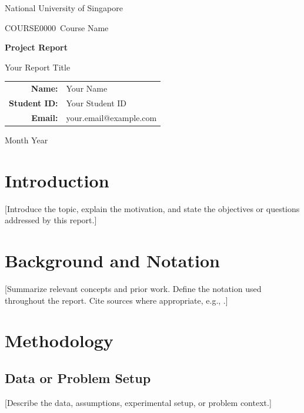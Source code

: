 \documentclass[11pt]{article}
\makeatletter
\newcommand{\University}{National University of Singapore}
\newcommand{\CourseCode}{COURSE0000}
\newcommand{\CourseName}{Course Name}
\newcommand{\ReportType}{Project Report}
\newcommand{\ReportTitle}{Your Report Title}
\newcommand{\StudentName}{Your Name}
\newcommand{\StudentID}{Your Student ID}
\newcommand{\StudentEmail}{your.email@example.com}
\newcommand{\ReportDate}{Month Year}
\makeatother
\begin{document}
\begin{titlepage}
\centering
\vspace*{2.0cm}
{\Large \University\par}
\vspace{0.4cm}
{\large \CourseCode\ \CourseName\par}
\vspace{2.0cm}
{\Huge\bfseries \ReportType\par}
\vspace{0.35cm}
{\LARGE \ReportTitle\par}
\vfill
\begin{tabular}{rl}
\textbf{Name:} & \StudentName\\
\textbf{Student ID:} & \StudentID\\
\textbf{Email:} & \StudentEmail\\
\end{tabular}
\vfill
{\large \ReportDate\par}
\end{titlepage}

\begin{abstract}
[Summarize the problem, approach, main findings, and conclusion.
Replace this paragraph with your own abstract.]
\end{abstract}


\section{Introduction}
[Introduce the topic, explain the motivation, and state the objectives
or questions addressed by this report.]

\section{Background and Notation}
[Summarize relevant concepts and prior work. Define the notation used
throughout the report. Cite sources where appropriate, e.g.,
\cite{example-reference}.]

\section{Methodology}
\subsection{Data or Problem Setup}
[Describe the data, assumptions, experimental setup, or problem context.]
\end{document}
